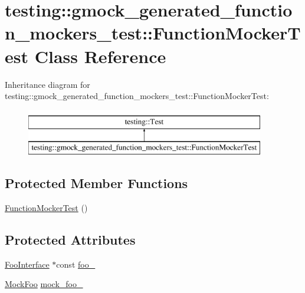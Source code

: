 \hypertarget{classtesting_1_1gmock__generated__function__mockers__test_1_1FunctionMockerTest}{}\section{testing\+::gmock\+\_\+generated\+\_\+function\+\_\+mockers\+\_\+test\+::Function\+Mocker\+Test Class Reference}
\label{classtesting_1_1gmock__generated__function__mockers__test_1_1FunctionMockerTest}
Inheritance diagram for testing\+::gmock\+\_\+generated\+\_\+function\+\_\+mockers\+\_\+test\+::Function\+Mocker\+Test\+:\begin{figure}[H]
\begin{center}
\leavevmode
\includegraphics[height=2.000000cm]{classtesting_1_1gmock__generated__function__mockers__test_1_1FunctionMockerTest}
\end{center}
\end{figure}
\subsection*{Protected Member Functions}
\begin{DoxyCompactItemize}
\item 
\mbox{\hyperlink{classtesting_1_1gmock__generated__function__mockers__test_1_1FunctionMockerTest_a22216ac0755e96e21c0f76068ff64f03}{Function\+Mocker\+Test}} ()
\end{DoxyCompactItemize}
\subsection*{Protected Attributes}
\begin{DoxyCompactItemize}
\item 
\mbox{\hyperlink{classtesting_1_1gmock__generated__function__mockers__test_1_1FooInterface}{Foo\+Interface}} $\ast$const \mbox{\hyperlink{classtesting_1_1gmock__generated__function__mockers__test_1_1FunctionMockerTest_ae2b8b577c4808f2dff9797168468f65f}{foo\+\_\+}}
\item 
\mbox{\hyperlink{classtesting_1_1gmock__generated__function__mockers__test_1_1MockFoo}{Mock\+Foo}} \mbox{\hyperlink{classtesting_1_1gmock__generated__function__mockers__test_1_1FunctionMockerTest_a265659f07a0e75152ab295add4769585}{mock\+\_\+foo\+\_\+}}
\end{DoxyCompactItemize}
